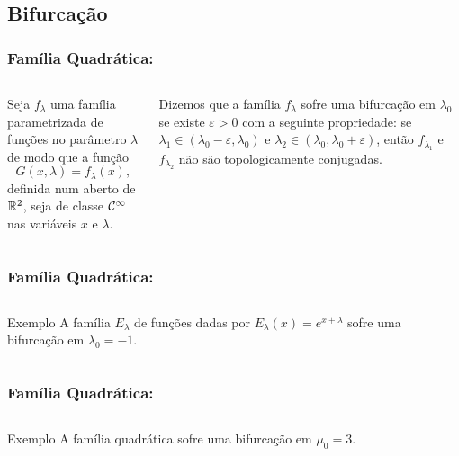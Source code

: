 \subsection{Bifurcação}


\begin{frame}
\vspace{5pt}
\frametitle{Família Quadrática: \subsecname}
\begin{columns}
\column{\dimexpr\paperwidth-15pt}

Seja $f_\lambda$ uma família parametrizada de funções no parâmetro $\lambda$ de modo que a função
$$G(x, \lambda) = f_\lambda(x),$$
definida num aberto de $\mathbb{R}^2$, seja de classe $\mathcal{C}^\infty$ nas variáveis $x$ e $\lambda$.

\begin{definition}
Dizemos que a família $f_\lambda$ sofre uma bifurcação em $\lambda_0$ se existe $\varepsilon > 0$ com a seguinte propriedade: se $\lambda_1 \in (\lambda_0 - \varepsilon, \lambda_0)$ e $\lambda_2 \in (\lambda_0, \lambda_0 + \varepsilon)$, então $f_{\lambda_1}$ e $f_{\lambda_2}$ não são topologicamente conjugadas.
\end{definition}

\end{columns}
\end{frame}


\begin{frame}
\vspace{5pt}
\frametitle{Família Quadrática: \subsecname}
\begin{columns}
\column{\dimexpr\paperwidth-15pt}

\begin{block}{Exemplo}
A família $E_\lambda$ de funções dadas por $E_\lambda(x) = e^{x + \lambda}$ sofre uma bifurcação em $\lambda_0 = -1$.
\end{block}

\end{columns}
\end{frame}


\begin{frame}
\vspace{5pt}
\frametitle{Família Quadrática: \subsecname}
\begin{columns}
\column{\dimexpr\paperwidth-15pt}

\begin{block}{Exemplo}
A família quadrática sofre uma bifurcação em $\mu_0 = 3$.
\end{block}

\end{columns}
\end{frame}

